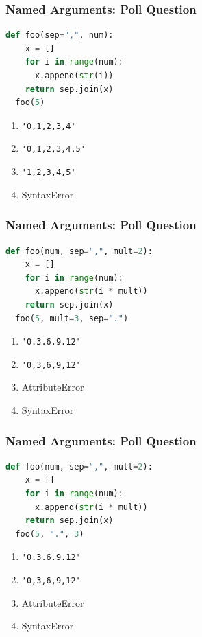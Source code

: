 \documentclass{beamer}
\begin{document}
%
%
\begin{frame}[fragile]
  \frametitle{Named Arguments: Poll Question}
  \begin{lstlisting}[language=Python, autogobble]
  def foo(sep=",", num):
    x = []
    for i in range(num):
      x.append(str(i))
    return sep.join(x)
  foo(5)
  \end{lstlisting}
  \vfill
  \begin{enumerate}[A]
    \item \lstinline|'0,1,2,3,4'|
    \item \lstinline|'0,1,2,3,4,5'|
    \item \lstinline|'1,2,3,4,5'|
    \item SyntaxError
  \end{enumerate}
\end{frame}

%
%
\begin{frame}[fragile]
  \frametitle{Named Arguments: Poll Question}
  \begin{lstlisting}[language=Python, autogobble]
  def foo(num, sep=",", mult=2):
    x = []
    for i in range(num):
      x.append(str(i * mult))
    return sep.join(x)
  foo(5, mult=3, sep=".")
  \end{lstlisting}
  \vfill
  \begin{enumerate}[A]
    \item \lstinline|'0.3.6.9.12'|
    \item \lstinline|'0,3,6,9,12'|
    \item AttributeError
    \item SyntaxError
  \end{enumerate}
\end{frame}

%
%
\begin{frame}[fragile]
  \frametitle{Named Arguments: Poll Question}
  \begin{lstlisting}[language=Python, autogobble]
  def foo(num, sep=",", mult=2):
    x = []
    for i in range(num):
      x.append(str(i * mult))
    return sep.join(x)
  foo(5, ".", 3)
  \end{lstlisting}
  \vfill
  \begin{enumerate}[A]
    \item \lstinline|'0.3.6.9.12'|
    \item \lstinline|'0,3,6,9,12'|
    \item AttributeError
    \item SyntaxError
  \end{enumerate}
\end{frame}
\end{document}
